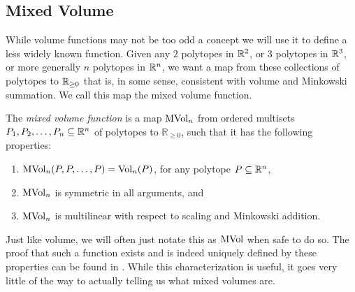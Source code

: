 \documentclass[12pt,oneside]{../../sfsuthesis}
\begin{document}
\subsection{Mixed Volume}
While volume functions may not be too odd a concept we will use it to define a less widely known function.
Given any \( 2 \) polytopes in \( \mathbb{R}^2 \), or \( 3 \) polytopes in \( \mathbb{R}^3 \), or more generally \( n \) polytopes in \( \mathbb{R}^n \), we want a map from these collections of polytopes to \( \mathbb{R}_{\geq 0} \) that is, in some sense, consistent with volume and Minkowski summation.
We call this map the mixed volume function.
\begin{definition}\th\label{def:mixedVolume}
    The \emph{mixed volume function} is a map \( \operatorname{MVol}_n \) from ordered multisets \( P_1, P_2, \dots, P_n \subseteq \mathbb{R}^n \) of polytopes to \( \mathbb{R}_{\geq 0} \), such that it has the following properties:
    \begin{enumerate}
        \item \( \operatorname{MVol}_n(P, P, \dots, P) = \operatorname{Vol}_n(P) \), for any polytope \( P \subseteq \mathbb{R}^n \),
        \item \( \operatorname{MVol}_n \) is symmetric in all arguments, and
        \item \( \operatorname{MVol}_n \) is multilinear with respect to scaling and Minkowski addition.
    \end{enumerate}
\end{definition}
Just like volume, we will often just notate this as \( \operatorname{MVol} \) when safe to do so.
The proof that such a function exists and is indeed uniquely defined by these properties can be found in \cite{schneiderConvexBodiesBrunn2013}.
While this characterization is useful, it goes very little of the way to actually telling us what mixed volumes are.
\end{document}
